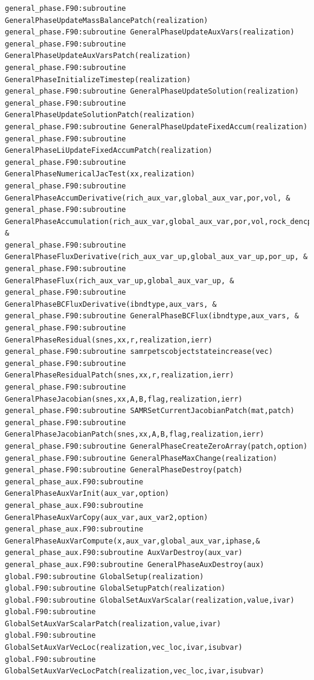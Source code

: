 \documentclass[12pt]{article}
\begin{document}
\begin{verbatim}
general_phase.F90:subroutine GeneralPhaseUpdateMassBalancePatch(realization)
general_phase.F90:subroutine GeneralPhaseUpdateAuxVars(realization)
general_phase.F90:subroutine GeneralPhaseUpdateAuxVarsPatch(realization)
general_phase.F90:subroutine GeneralPhaseInitializeTimestep(realization)
general_phase.F90:subroutine GeneralPhaseUpdateSolution(realization)
general_phase.F90:subroutine GeneralPhaseUpdateSolutionPatch(realization)
general_phase.F90:subroutine GeneralPhaseUpdateFixedAccum(realization)
general_phase.F90:subroutine GeneralPhaseLiUpdateFixedAccumPatch(realization)
general_phase.F90:subroutine GeneralPhaseNumericalJacTest(xx,realization)
general_phase.F90:subroutine GeneralPhaseAccumDerivative(rich_aux_var,global_aux_var,por,vol, &
general_phase.F90:subroutine GeneralPhaseAccumulation(rich_aux_var,global_aux_var,por,vol,rock_dencpr, &
general_phase.F90:subroutine GeneralPhaseFluxDerivative(rich_aux_var_up,global_aux_var_up,por_up, &
general_phase.F90:subroutine GeneralPhaseFlux(rich_aux_var_up,global_aux_var_up, &
general_phase.F90:subroutine GeneralPhaseBCFluxDerivative(ibndtype,aux_vars, &
general_phase.F90:subroutine GeneralPhaseBCFlux(ibndtype,aux_vars, &
general_phase.F90:subroutine GeneralPhaseResidual(snes,xx,r,realization,ierr)
general_phase.F90:subroutine samrpetscobjectstateincrease(vec)
general_phase.F90:subroutine GeneralPhaseResidualPatch(snes,xx,r,realization,ierr)
general_phase.F90:subroutine GeneralPhaseJacobian(snes,xx,A,B,flag,realization,ierr)
general_phase.F90:subroutine SAMRSetCurrentJacobianPatch(mat,patch) 
general_phase.F90:subroutine GeneralPhaseJacobianPatch(snes,xx,A,B,flag,realization,ierr)
general_phase.F90:subroutine GeneralPhaseCreateZeroArray(patch,option)
general_phase.F90:subroutine GeneralPhaseMaxChange(realization)
general_phase.F90:subroutine GeneralPhaseDestroy(patch)
general_phase_aux.F90:subroutine GeneralPhaseAuxVarInit(aux_var,option)
general_phase_aux.F90:subroutine GeneralPhaseAuxVarCopy(aux_var,aux_var2,option)
general_phase_aux.F90:subroutine GeneralPhaseAuxVarCompute(x,aux_var,global_aux_var,iphase,&
general_phase_aux.F90:subroutine AuxVarDestroy(aux_var)
general_phase_aux.F90:subroutine GeneralPhaseAuxDestroy(aux)
global.F90:subroutine GlobalSetup(realization)
global.F90:subroutine GlobalSetupPatch(realization)
global.F90:subroutine GlobalSetAuxVarScalar(realization,value,ivar)
global.F90:subroutine GlobalSetAuxVarScalarPatch(realization,value,ivar)
global.F90:subroutine GlobalSetAuxVarVecLoc(realization,vec_loc,ivar,isubvar)
global.F90:subroutine GlobalSetAuxVarVecLocPatch(realization,vec_loc,ivar,isubvar)

\end{verbatim}
\end{document}
